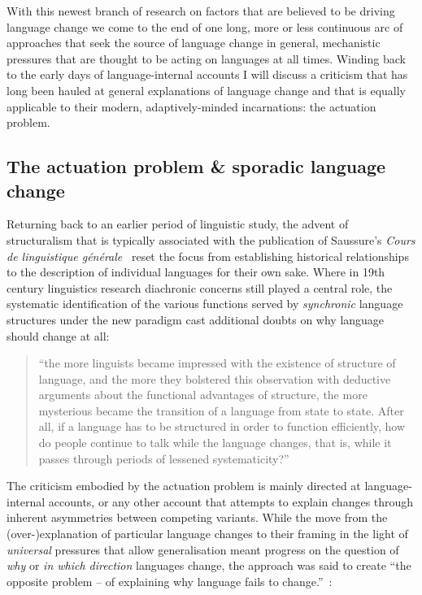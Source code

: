 With this newest branch of research on factors that are believed to be driving language change we come to the end of one long, more or less continuous arc of approaches that seek the source of language change in general, mechanistic pressures that are thought to be acting on languages at all times. Winding back to the early days of language-internal accounts I will discuss a criticism that has long been hauled at general explanations of language change and that is equally applicable to their modern, adaptively-minded incarnations: the actuation problem.

\subsection{The actuation problem \& sporadic language change}
\label{sec:actuationproblem}

Returning back to an earlier period of linguistic study, the advent of structuralism that is typically associated with the publication of Saussure's \emph{Cours de linguistique générale}~\citeyearpar{Saussure1916} reset the focus from establishing historical relationships to the description of individual languages for their own sake. %
Where in 19th century linguistics research diachronic concerns still played a central role, the systematic identification of the various functions served by \emph{synchronic} language structures under the new paradigm cast additional doubts on why language should change at all:

\begin{quote}
``the more linguists became impressed with the existence of structure of language, and the more they bolstered this observation with deductive arguments about the functional advantages of structure, the more mysterious became the transition of a language from state to state. After all, if a language has to be structured in order to function efficiently, how do people continue to talk while the language changes, that is, while it passes through periods of lessened systematicity?''~\citep[p.100]{Weinreich1968}
\end{quote}

The criticism embodied by the actuation problem is mainly directed at language-internal accounts, or any other account that attempts to explain changes through inherent asymmetries between competing variants.
While the move from the (over-)explanation of particular language changes to their framing in the light of \emph{universal} pressures that allow generalisation meant progress on the question of \emph{why} or \emph{in which direction} languages change, the approach was said to create ``the opposite problem -- of explaining why language fails to change.''~\citep[p.112]{Weinreich1968}:

